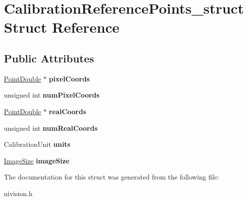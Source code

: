 \hypertarget{structCalibrationReferencePoints__struct}{
\section{CalibrationReferencePoints\_\-struct Struct Reference}
\label{structCalibrationReferencePoints__struct}
}
\subsection*{Public Attributes}
\begin{DoxyCompactItemize}
\item 
\hypertarget{structCalibrationReferencePoints__struct_a670f61dd514b1e9cdbc2fa858db1d7df}{
\hyperlink{structPointDouble__struct}{PointDouble} $\ast$ {\bfseries pixelCoords}}
\label{structCalibrationReferencePoints__struct_a670f61dd514b1e9cdbc2fa858db1d7df}

\item 
\hypertarget{structCalibrationReferencePoints__struct_a51bf689d3816c8b48b9b8463aa282314}{
unsigned int {\bfseries numPixelCoords}}
\label{structCalibrationReferencePoints__struct_a51bf689d3816c8b48b9b8463aa282314}

\item 
\hypertarget{structCalibrationReferencePoints__struct_a75dc31b618604851e4c38c2170d90b3f}{
\hyperlink{structPointDouble__struct}{PointDouble} $\ast$ {\bfseries realCoords}}
\label{structCalibrationReferencePoints__struct_a75dc31b618604851e4c38c2170d90b3f}

\item 
\hypertarget{structCalibrationReferencePoints__struct_a72ecacdd263a8a33b42a30ec832e0b8f}{
unsigned int {\bfseries numRealCoords}}
\label{structCalibrationReferencePoints__struct_a72ecacdd263a8a33b42a30ec832e0b8f}

\item 
\hypertarget{structCalibrationReferencePoints__struct_aa83cfa292ada3537500d33fed9c3319a}{
CalibrationUnit {\bfseries units}}
\label{structCalibrationReferencePoints__struct_aa83cfa292ada3537500d33fed9c3319a}

\item 
\hypertarget{structCalibrationReferencePoints__struct_a0c7133d3ec137d95a8ff3ad0cfdc232d}{
\hyperlink{structImageSize__struct}{ImageSize} {\bfseries imageSize}}
\label{structCalibrationReferencePoints__struct_a0c7133d3ec137d95a8ff3ad0cfdc232d}

\end{DoxyCompactItemize}


The documentation for this struct was generated from the following file:\begin{DoxyCompactItemize}
\item 
nivision.h\end{DoxyCompactItemize}
